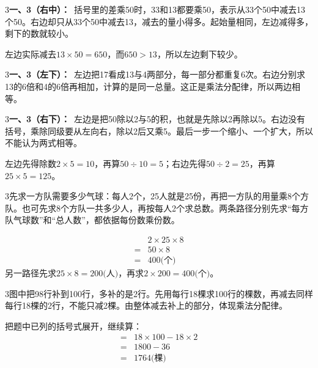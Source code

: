 \documentclass[multi=snippet,border={5bp 20bp 5bp 5bp}]{standalone}
\newenvironment{snippet}[3]{\begin{minipage}{#1bp}\color{answerred}\fontsize{#2}{#3}\selectfont\raggedright}{\end{minipage}}
\begin{document}
\begin{snippet}{505}{11.5}{14}\begin{multicols}{3}\raggedcolumns \textbf{一、3（右中）：}\ 括号里的差乘50时，33和13都要乘50，表示从33个50中减去13个50。右边却只从33个50中减去13，减去的量小得多。起始量相同，左边减得多，剩下的数就较小。\par 左边实际减去\(13\times50=650\)\allowbreak ，而\(650>13\)\allowbreak ，所以左边剩下较少。\end{multicols}\end{snippet}
\begin{snippet}{505}{11.5}{14}\begin{multicols}{3}\raggedcolumns \textbf{一、3（左下）：}\ 左边把17看成13与4两部分，每一部分都重复6次。右边分别求13的6倍和4的6倍再相加，计算的是同一总量。这正是乘法分配律，所以两边相等。\end{multicols}\end{snippet}
\begin{snippet}{505}{11.5}{14}\begin{multicols}{3}\raggedcolumns \textbf{一、3（右下）：}\ 左边是把50除以2与5的积，也就是先除以2再除以5。右边没有括号，乘除同级要从左向右，除以2后又乘5。最后一步一个缩小、一个扩大，所以不能认为两式相等。\par 左边先得除数\(2\times5=10\)\allowbreak ，再算\(50\div10=5\)\allowbreak ；右边先得\(50\div2=25\)\allowbreak ，再算\(25\times5=125\)\allowbreak 。\end{multicols}\end{snippet}
\begin{snippet}{505}{11.5}{14}\begin{multicols}{3}\raggedcolumns 先求一方队需要多少气球：每人2个，25人就是25份，再把一方队的用量乘8个方队。也可先求8个方队一共多少人，再按每人2个求总数。两条路径分别先求“每方队气球数”和“总人数”，都依据每份数乘份数。\par \[\begin{aligned}&2\times25\times8\\={}&50\times8\\={}&400\text{(个)}\end{aligned}\]另一路径先求\(25\times8=200\text{(人)}\)\allowbreak ，再求\(2\times200=400\text{(个)}\)\allowbreak 。\end{multicols}\end{snippet}
\begin{snippet}{505}{11.5}{14}\begin{multicols}{3}\raggedcolumns 图中把98行补到100行，多补的是2行。先用每行18棵求100行的棵数，再减去同样每行18棵的2行，不能只减2棵。由整体减去补上的部分，体现乘法分配律。\par 把题中已列的括号式展开，继续算：\[\begin{aligned}={}&18\times100-18\times2\\={}&1800-36\\={}&1764\text{(棵)}\end{aligned}\]\end{multicols}\end{snippet}
\end{document}
